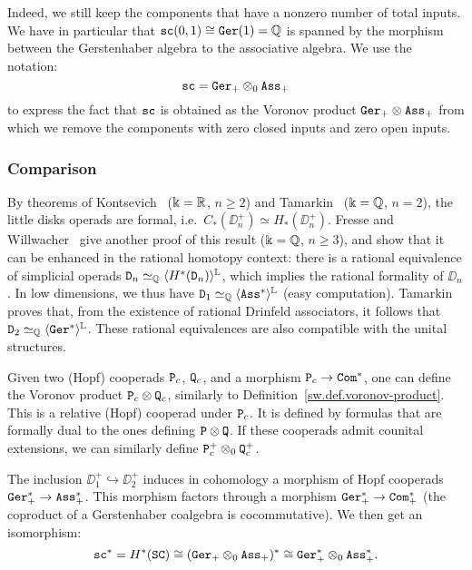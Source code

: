 Indeed, we still keep the components that have a nonzero number of total inputs.
We have in particular that $\mathtt{sc}(0,1) \cong \mathtt{Ger}(1) = \mathbb{Q}$ is spanned by the morphism between the Gerstenhaber algebra to the associative algebra.
We use the notation:
\[ \mathtt{sc} = \mathtt{Ger}_{+} \otimes_{0} \mathtt{Ass}_{+} \]
to express the fact that $\mathtt{sc}$ is obtained as the Voronov product $\mathtt{Ger}_{+} \otimes \mathtt{Ass}_{+}$ from which we remove the components with zero closed inputs and zero open inputs.

\subsubsection{Comparison}
\label{sw.sec.comparison}

By theorems of Kontsevich~\cite{Kontsevich1999} ($\Bbbk = \mathbb{R}$, $n \ge 2$) and Tamarkin~\cite{Tamarkin2003} ($\Bbbk = \mathbb{Q}$, $n = 2$), the little disks operads are formal, i.e.\ $C_{*}(\DD_{n}^{+}) \simeq H_{*}(\DD_{n}^{+})$.
Fresse and Willwacher~\cite{FresseWillwacher2015} give another proof of this result ($\Bbbk = \mathbb{Q}$, $n \ge 3$), and show that it can be enhanced in the rational homotopy context: there is a rational equivalence of simplicial operads $\mathtt{D}_{n} \simeq_{\mathbb{Q}} \langle H^{*}(\mathtt{D}_{n}) \rangle^{\mathbb{L}}$, which implies the rational formality of $\DD_{n}$.
In low dimensions, we thus have $\mathtt{D}_{1} \simeq_{\mathbb{Q}} \langle \mathtt{Ass}^{*} \rangle^{\mathbb{L}}$ (easy computation).
Tamarkin proves that, from the existence of rational Drinfeld associators, it follows that $\mathtt{D}_{2} \simeq_{\mathbb{Q}} \langle \mathtt{Ger}^{*} \rangle^{\mathbb{L}}$.
These rational equivalences are also compatible with the unital structures.

Given two (Hopf) cooperads $\mathtt{P}_{c}$, $\mathtt{Q}_{c}$, and a morphism $\mathtt{P}_{c} \to \mathtt{Com}^{*}$, one can define the Voronov product $\mathtt{P}_{c} \otimes \mathtt{Q}_{c}$, similarly to Definition~\ref{sw.def.voronov-product}.
This is a relative (Hopf) cooperad under $\mathtt{P}_{c}$.
It is defined by formulas that are formally dual to the ones defining $\mathtt{P} \otimes \mathtt{Q}$.
If these cooperads admit counital extensions, we can similarly define $\mathtt{P}^{+}_{c} \otimes_0 \mathtt{Q}^{+}_{c}$.

The inclusion $\DD_{1}^{+} \hookrightarrow \DD_{2}^{+}$ induces in cohomology a morphism of Hopf cooperads $\mathtt{Ger}_{+}^{*} \to \mathtt{Ass}_{+}^{*}$.
This morphism factors through a morphism $\mathtt{Ger}_{+}^{*} \to \mathtt{Com}_{+}^{*}$ (the coproduct of a Gerstenhaber coalgebra is cocommutative).
We then get an isomorphism:
\[ \mathtt{sc}^{*} = H^{*}(\mathtt{SC}) \cong (\mathtt{Ger}_{+} \otimes_0 \mathtt{Ass}_{+})^{*} \cong \mathtt{Ger}_{+}^{*} \otimes_0 \mathtt{Ass}_{+}^{*}. \]

